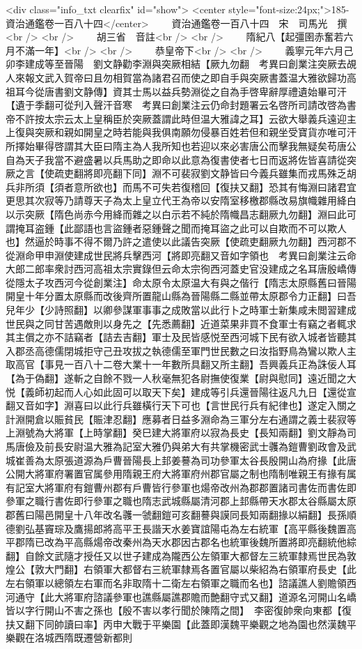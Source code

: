 <div class="info_txt clearfix" id="show">
<center style="font-size:24px;">185-資治通鑑卷一百八十四</center>
  　　資治通鑑卷一百八十四　宋　司馬光　撰<br />
<br />
　　胡三省　音註<br />
<br />
　　隋紀八【起彊圉赤奮若六月不滿一年】<br />
<br />
　　恭皇帝下<br />
<br />
　　義寧元年六月己卯李建成等至晉陽　劉文静勸李淵與突厥相結【厥九勿翻　考異曰創業注突厥去覘人來報文武入賀帝曰且勿相賀當為諸君召而使之即自手與突厥書蓋温大雅欲歸功高祖耳今從唐書劉文静傳】資其士馬以益兵勢淵從之自為手啓卑辭厚禮遺始畢可汗【遺于季翻可從刋入聲汗音寒　考異曰創業注云仍命封題署云名啓所司請改啓為書帝不許按太宗云太上皇稱臣於突厥蓋謂此時但温大雅諱之耳】云欲大舉義兵遠迎主上復與突厥和親如開皇之時若能與我俱南願勿侵暴百姓若但和親坐受寶貨亦唯可汗所擇始畢得啓謂其大臣曰隋主為人我所知也若迎以來必害唐公而擊我無疑矣苟唐公自為天子我當不避盛暑以兵馬助之即命以此意為復書使者七日而返將佐皆喜請從突厥之言【使疏吏翻將即亮翻下同】淵不可裴寂劉文静皆曰今義兵雖集而戎馬殊乏胡兵非所須【須者意所欲也】而馬不可失若復稽回【復扶又翻】恐其有悔淵曰諸君宜更思其次寂等乃請尊天子為太上皇立代王為帝以安隋室移檄郡縣改易旗幟雜用絳白以示突厥【隋色尚赤今用絳而雜之以白示若不純於隋幟昌志翻厥九勿翻】淵曰此可謂掩耳盗鍾【此鄙語也言盜鍾者惡鍾聲之聞而掩耳盜之此可以自欺而不可以欺人也】然逼於時事不得不爾乃許之遣使以此議告突厥【使疏吏翻厥九勿翻】西河郡不從淵命甲申淵使建成世民將兵擊西河【將即亮翻又音如字領也　考異曰創業注云命大郎二郎率衆討西河高祖太宗實錄但云命太宗徇西河蓋史官没建成之名耳唐殷嶠傳從隱太子攻西河今從創業注】命太原令太原温大有與之偕行【隋志太原縣舊曰晉陽開皇十年分置太原縣而改後齊所置龍山縣為晉陽縣二縣並帶太原郡令力正翻】曰吾兒年少【少詩照翻】以卿參謀軍事事之成敗當以此行卜之時軍士新集咸未閲習建成世民與之同甘苦遇敵則以身先之【先悉薦翻】近道菜果非買不食軍士有竊之者輒求其主償之亦不詰竊者【詰去吉翻】軍士及民皆感悦至西河城下民有欲入城者皆聽其入郡丞高德儒閉城拒守己丑攻拔之執德儒至軍門世民數之曰汝指野鳥為鸞以欺人主取高官【事見一百八十二卷大業十一年數所具翻又所主翻】吾興義兵正為誅佞人耳【為于偽翻】遂斬之自餘不戮一人秋毫無犯各尉撫使復業【尉與慰同】遠近聞之大悦【義師初起而人心如此固可以取天下矣】建成等引兵還晉陽往返凡九日【還從宣翻又音如字】淵喜曰以此行兵雖橫行天下可也【言世民行兵有紀律也】遂定入關之計淵開倉以賑貧民【賑津忍翻】應募者日益多淵命為三軍分左右通謂之義士裴寂等上淵號為大將軍【上時掌翻】癸巳建大將軍府以寂為長史【長知兩翻】劉文靜為司馬唐儉及前長安尉温大雅為記室大雅仍與弟大有共掌機密武士彠為鎧曹劉政會及武城崔善為太原張道源為戶曹晉陽長上邽姜謩為司功參軍太谷長殷開山為府掾【此唐公開大將軍府署置官属參用隋親王府大將軍府州郡官屬之制也隋制唯親王有掾有属有記室大將軍府有鎧曹州郡有戶曹皆行參軍也煬帝改州為郡郡置諸司書佐而書佐即參軍之職行書佐即行參軍之職也隋志武城縣屬清河郡上邽縣帶天水郡太谷縣屬太原郡舊曰陽邑開皇十八年改名彠一虢翻鎧可亥翻謩與謨同長知兩翻掾以絹翻】長孫順德劉弘基竇琮及鷹揚郎將高平王長諧天水姜寶誼陽屯為左右統軍【高平縣後魏置高平郡隋已改為平高縣煬帝改秦州為天水郡因古郡名也統軍後魏所置將即亮翻統他綜翻】自餘文武隨才授任又以世子建成為隴西公左領軍大都督左三統軍隸焉世民為敦煌公【敦大門翻】右領軍大都督右三統軍隸焉各置官屬以柴紹為右領軍府長史【此左右領軍以總領左右軍而名非取隋十二衛左右領軍之職而名也】諮議譙人劉贍領西河通守【此大將軍府諮議參軍也譙縣屬譙郡贍而艶翻守式又翻】道源名河開山名嶠皆以字行開山不害之孫也【殷不害以孝行聞於陳隋之間】　李密復帥衆向東都【復扶又翻下同帥讀曰率】丙申大戰于平樂園【此蓋即漢魏平樂觀之地為園也然漢魏平樂觀在洛城西隋既遷營新都則